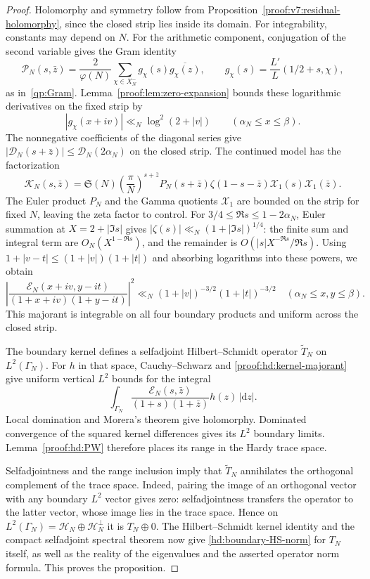 \documentclass[12pt,a4paper]{amsart}
\numberwithin{equation}{section}
\def\le{\leqslant}
\theoremstyle{plain}
\theoremstyle{definition}
\theoremstyle{remark}
\begin{document}
\begin{proof}
Holomorphy and symmetry follow from
Proposition~\ref{proof:v7:residual-holomorphy}, since the closed strip
lies inside its domain. For integrability, constants may depend
on $N$. For the arithmetic component, conjugation of the second
variable gives the Gram identity
\[
 \mathscr P_N(s,\bar z)=\frac2{\varphi(N)}
       \sum_{\chi\in X_N^-}g_\chi(s)\overline{g_\chi(z)},
 \qquad g_\chi(s)=\frac{L'}L(1/2+s,\chi),
\]
as in~\eqref{qp:Gram}.
Lemma~\ref{proof:lem:zero-expansion} bounds these logarithmic
derivatives on the fixed strip by
\[
 |g_\chi(x+iv)|\ll_N\log^2(2+|v|)
       \qquad(\alpha_N\le x\le\beta).
\]
The nonnegative coefficients of the diagonal series give
$|\mathscr D_N(s+\bar z)|\le\mathscr D_N(2\alpha_N)$ on the
closed strip. The continued model has the factorization
\[
 \mathscr K_N(s,\bar z)=\mathfrak S(N)
 \left(\frac\pi N\right)^{s+\bar z}P_N(s+\bar z)
 \zeta(1-s-\bar z)\mathcal X_1(s)\mathcal X_1(\bar z).
\]
The Euler product $P_N$ and the Gamma quotients $\mathcal X_1$
are bounded on the strip for fixed $N$, leaving the zeta factor
to control. For
$3/4\le\Re s\le1-2\alpha_N$, Euler summation at
$X=2+|\Im s|$ gives
$|\zeta(s)|\ll_N(1+|\Im s|)^{1/4}$: the finite sum and
integral term are $O_N(X^{1-\Re s})$, and the remainder is
$O(|s|X^{-\Re s}/\Re s)$.
Using $1+|v-t|\le(1+|v|)(1+|t|)$ and absorbing logarithms
into these powers, we obtain
\begin{equation}\label{proof:hd:kernel-majorant}
 \left|\frac{\mathscr E_N(x+iv,y-it)}{(1+x+iv)(1+y-it)}\right|^2
 \ll_N(1+|v|)^{-3/2}(1+|t|)^{-3/2}
 \quad(\alpha_N\le x,y\le\beta).
\end{equation}
This majorant is integrable on all four boundary products and
uniform across the closed strip.

The boundary kernel defines a selfadjoint Hilbert--Schmidt
operator $\widetilde T_N$ on $L^2(\Gamma_N)$.
For $h$ in that space, Cauchy--Schwarz and
\eqref{proof:hd:kernel-majorant} give uniform vertical $L^2$ bounds
for the integral
\[
 \int_{\Gamma_N}
       \frac{\mathscr E_N(s,\bar z)}{(1+s)(1+\bar z)}h(z)\,|\mathrm{d}z|.
\]
Local domination and Morera's theorem give holomorphy. Dominated convergence of the
squared kernel differences gives its $L^2$ boundary limits.
Lemma~\ref{proof:hd:PW} therefore places its range in the Hardy trace space.

Selfadjointness and the range inclusion imply that $\widetilde T_N$
annihilates the orthogonal complement of the trace space.
Indeed, pairing the image of an orthogonal vector with any
boundary $L^2$ vector gives zero: selfadjointness transfers the
operator to the latter vector, whose image lies in the trace space. Hence on
$L^2(\Gamma_N)=\mathcal H_N\oplus\mathcal H_N^\perp$ it is
$T_N\oplus0$. The Hilbert--Schmidt kernel identity and the
compact selfadjoint spectral theorem now give
\eqref{hd:boundary-HS-norm} for $T_N$ itself, as well as the
reality of the eigenvalues and the asserted operator norm formula.
This proves the proposition.
\end{proof}
\end{document}
